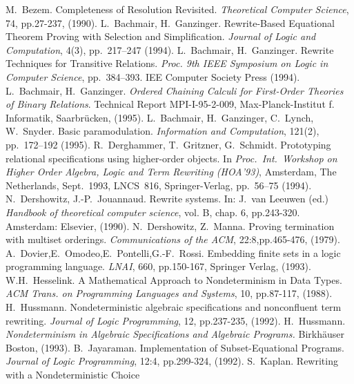 \begin{thebibliography}{MM99}
 M.~Bezem. 
   Completeness of Resolution Revisited. 
   {\it Theoretical Computer Science}, 74, pp.27-237, (1990).
 L.~Bachmair, H.~Ganzinger. 
   Rewrite-Based Equational Theorem Proving with Selection and
   Simplification. {\it Journal of Logic and Computation}, 4(3),
   pp.~217--247 (1994).
 L.~Bachmair, H.~Ganzinger. 
   Rewrite Techniques for Transitive Relations.
   {\it Proc. 9th IEEE Symposium on Logic in Computer Science}, pp.~384--393.
   IEE Computer Society Press (1994).
 L.~Bachmair, H.~Ganzinger. 
   {\it Ordered Chaining Calculi for First-Order Theories of Binary Relations}.
   Technical Report MPI-I-95-2-009, Max-Planck-Institut f. Informatik, 
   Saarbr\"ucken, (1995).
 L.~Bachmair, H.~Ganzinger, C.~Lynch,  W.~Snyder. 
   Basic paramodulation. {\it Information and Computation}, 121(2),
   pp.~172--192 (1995). 
 R.~Derghammer, T.~Gritzner, G.~Schmidt. Prototyping
   relational specifications using higher-order objects. In {\it
   Proc.\ Int.\ Workshop on Higher Order Algebra, Logic and Term Rewriting
   (HOA'93)}, Amsterdam, The Netherlands, Sept.\ 1993, LNCS~816,
   Springer-Verlag, pp.~56--75 (1994).
 N.~Dershowitz, J.-P.~Jouannaud. 
   Rewrite systems. In: J.~van Leeuwen (ed.) 
   {\it Handbook of theoretical computer science}, vol. B,
   chap. 6, pp.243-320. Amsterdam: Elsevier, (1990).
 N.~Dershowitz, Z.~Manna. 
   Proving termination with multiset orderings. 
   {\it Communications of the ACM}, 22:8,pp.465-476, (1979).
 A.~Dovier,E.~Omodeo,E.~Pontelli,G.-F.~Rossi. 
   Embedding finite sets in a logic programming language. 
   {\it LNAI}, 660, pp.150-167, Springer Verlag, (1993).
 W.H.~Hesselink. A Mathematical Approach to Nondeterminism
   in Data Types. {\it ACM Trans. on Programming Languages and Systems},
   10, pp.87-117, (1988).
 H.~Hussmann. Nondeterministic algebraic
   specifications and nonconfluent term rewriting. {\it Journal of Logic
   Programming}, 12, pp.237-235, (1992).
 H.~Hussmann. 
   {\it Nondeterminism in Algebraic Specifications and Algebraic Programs.}
   Birkh\"auser Boston, (1993).
 B.~Jayaraman. Implementation of Subset-Equational 
   Programs. {\it Journal of Logic Programming}, 12:4, pp.299-324, (1992).
 S.~Kaplan. Rewriting with a Nondeterministic Choice

\end{thebibliography}
